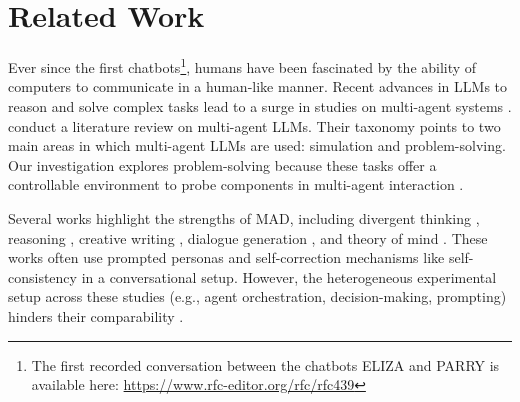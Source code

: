 \section{Related Work}

Ever since the first chatbots\footnote{The first recorded conversation between the chatbots ELIZA and PARRY is available here: \url{https://www.rfc-editor.org/rfc/rfc439}}, humans have been fascinated by the ability of computers to communicate in a human-like manner.
Recent advances in LLMs to reason and solve complex tasks \citep{OpenAIAAA24a} lead to a surge in studies on multi-agent systems \citep{ZhaoHXL23a, XuYLW23a, SuzgunK24a}.
\citet{GuoCWC24a} conduct a literature review on multi-agent LLMs.
Their taxonomy points to two main areas in which multi-agent LLMs are used: simulation and problem-solving.
Our investigation explores problem-solving because these tasks offer a controllable environment to probe components in multi-agent interaction \citep{YinSCG23a, DuLTT23}. %

Several works highlight the strengths of MAD, including divergent thinking \citep{degenofthought}, reasoning \citep{YinSCG23a}, creative writing \citep{SchickDJP22a}, dialogue generation \citep{ChenSB24a}, and theory of mind \citep{LiCSC23a}.
These works often use prompted personas \citep{WangMWG23a, XuYLW23a} and self-correction mechanisms like self-consistency \citep{WangWSL23} in a conversational setup.
However, the heterogeneous experimental setup across these studies (e.g., agent orchestration, decision-making, prompting) hinders their comparability \citep{Becker24, GuoCWC24a}.

